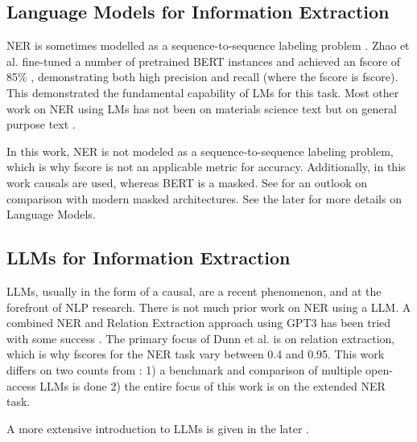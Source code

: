 \subsection{Language Models for Information Extraction}\label{sub:lmie}
\gls{NER} is sometimes modelled as a sequence-to-sequence labeling problem \cite{zhao_finetuning_2021, dunn_structured_2022}.
Zhao et al. fine-tuned a number of pretrained \gls{BERT} instances and achieved an \gls{fscore} of 85\% \cite{zhao_finetuning_2021}, demonstrating both high precision and recall (where the \gls{fscore} is \glsdesc{fscore}).
This demonstrated the fundamental capability of \glspl{LM} for this task.
Most other work on \gls{NER} using \glspl{LM} has not been on materials science text but on general purpose text \cite{li_survey_2022}.


In this work, \gls{NER} is not modeled as a sequence-to-sequence labeling problem, which is why \gls{fscore} is not an applicable metric for accuracy.
Additionally, in this work \glspl{causal} are used, whereas \gls{BERT} is a \gls{masked}.
See  for an outlook on comparison with modern \gls{masked} architectures. See the later  for more details on Language Models.

\subsection{LLMs for Information Extraction}\label{sub:llmie}
\glspl{LLM}, usually in the form of a \gls{causal}, are a recent phenomenon, and at the forefront of \gls{NLP} research.
There is not much prior work on \gls{NER} using a \gls{LLM}.
A combined \gls{NER} and Relation Extraction approach using \gls{GPT3} has been tried with some success \cite{dunn_structured_2022}.
The primary focus of Dunn et al. \cite{dunn_structured_2022} is on relation extraction, which is why \glspl{fscore} for the \gls{NER} task vary between 0.4 and 0.95.
This work differs on two counts from \cite{dunn_structured_2022}: 1) a benchmark and comparison of multiple open-access \glspl{LLM} is done 2) the entire focus of this work is on the extended \gls{NER} task.

A more extensive introduction to \glspl{LLM} is given in the later .

